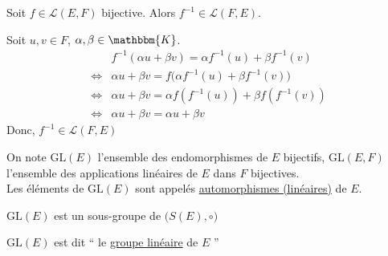 \begin{prop}
	Soit $f \in \mathcal{L}(E,F)$ bijective. Alors $f^{-1} \in \mathcal{L}(F,E)$.
\end{prop}

\begin{prv}
	Soit $u,v\in F$, $\alpha, \beta \in \mathbbm{K}$.
	\begin{align*}
		&f^{-1}(\alpha u + \beta v) = \alpha f^{-1}(u) + \beta f^{-1}(v)\\
		\iff& \alpha u + \beta v = f\big(\alpha f^{-1}(u) + \beta f^{-1}(v)\big)\\
		\iff& \alpha u + \beta v = \alpha f\left( f^{-1}(u) \right) + \beta f\left( f^{-1}(v) \right) \\
		\iff& \alpha u + \beta v = \alpha u + \beta v
	\end{align*}
	Donc, $f^{-1} \in \mathcal{L}(F,E)$
\end{prv}

\begin{rmk}
	[Notation]
	On note $\mathrm{GL}(E)$ l'ensemble des endomorphismes de $E$ bijectifs, $\mathrm{GL}(E,F)$ l'ensemble des applications linéaires de $E$ dans $F$ bijectives.\\
	Les éléments de $\mathrm{GL}(E)$ sont appelés \underline{automorphismes (linéaires)} de $E$.
\end{rmk}

\begin{crlr}
	$\mathrm{GL}(E)$ est un sous-groupe de $\big(S(E),  \circ\big)$
\end{crlr}

\begin{defn}
	$\mathrm{GL}(E)$ est dit `` le \underline{groupe linéaire} de $E$ ''
\end{defn}
